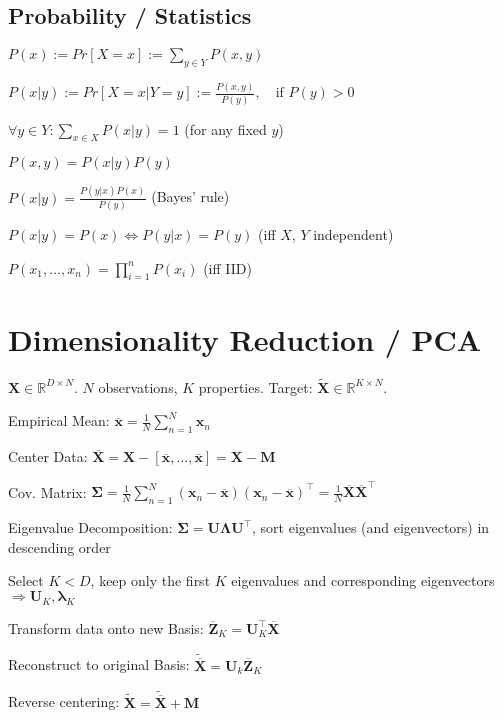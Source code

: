 \documentclass[a4paper, 11pt, landscape]{article}
\newenvironment{inlinelist}%
{\begin{enumerate*}[label=\textbf{\color{red}\theenumi.}]}%
{\end{enumerate*}}
\begin{document}
\begin{multicols*}{3}
\subsection{Probability / Statistics}
\begin{inparaitem}[\color{red}\textbullet]
	\item $P(x) := Pr[X = x] := \sum_{y \in Y} P(x, y)$
	\item $P(x|y) := Pr[X = x | Y = y] := \frac{P(x,y)}{P(y)},\quad \text{if } P(y) > 0$
	\item $\forall y \in Y: \sum_{x \in X} P(x|y) = 1$ (for any fixed $y$)
	\item $P(x, y) = P(x|y) P(y)$
	\item $P(x|y) = \frac{P(y|x)P(x)}{P(y)}$ (Bayes' rule)
	\item $P(x|y) = P(x) \Leftrightarrow P(y|x) = P(y)$ (iff $X$, $Y$ independent)
	\item $P(x_1, \ldots, x_n) = \prod_{i=1}^n P(x_i)$ (iff IID)
\end{inparaitem}


\section{Dimensionality Reduction / PCA}
$\mathbf{X} \in \mathbb{R}^{D \times N}$. $N$ observations, $K$ properties. Target: $\tilde{\mathbf{X}} \in \mathbb{R}^{K \times N}$.
\begin{inlinelist}
	\item Empirical Mean: $\overline{\mathbf{x}} = \frac{1}{N} \sum_{n=1}^N \mathbf{x}_n$
	\item Center Data: $\overline{\mathbf{X}} = \mathbf{X} - [\overline{\mathbf{x}}, \ldots, \overline{\mathbf{x}}] = \mathbf{X} - \mathbf{M}$
	\item Cov. Matrix: $\boldsymbol{\Sigma} = \frac{1}{N	} \sum_{n=1}^N (\mathbf{x}_n - \overline{\mathbf{x}}) (\mathbf{x}_n - \overline{\mathbf{x}})^\top = \frac{1}{N} \overline{\mathbf{X}}\overline{\mathbf{X}}^\top$
	\item Eigenvalue Decomposition: $\boldsymbol{\Sigma} = \mathbf{U} \boldsymbol{\Lambda} \mathbf{U}^\top$, sort eigenvalues (and eigenvectors) in descending order
	\item Select $K < D$, keep only the first $K$ eigenvalues and corresponding eigenvectors $\Rightarrow \mathbf{U}_K, \boldsymbol{\lambda}_K$
	\item Transform data onto new Basis: $\overline{\mathbf{Z}}_K = \mathbf{U}_K^\top \overline{\mathbf{X}}$
	\item Reconstruct to original Basis: $\tilde{\overline{\mathbf{X}}} = \mathbf{U}_k \overline{\mathbf{Z}}_K$
	\item Reverse centering: $\tilde{\mathbf{X}} = \tilde{\overline{\mathbf{X}}} + \mathbf{M}$
\end{inlinelist}


\end{multicols*}
\end{document}
